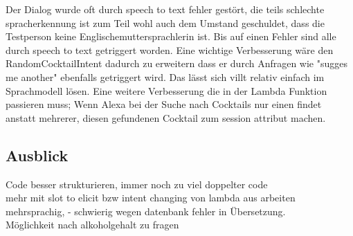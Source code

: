 \documentclass[12pt,letterpaper]{article}
\begin{document}
Der Dialog wurde oft durch speech to text fehler gestört, die teils schlechte spracherkennung ist zum Teil wohl auch dem Umstand geschuldet, dass die Testperson keine Englischemuttersprachlerin ist.
Bis auf einen Fehler sind alle durch speech to text getriggert worden.
Eine wichtige Verbesserung wäre den RandomCocktailIntent dadurch zu erweitern dass er durch Anfragen wie "sugges me another" ebenfalls getriggert wird. Das lässt sich villt relativ einfach im Sprachmodell lösen.
Eine weitere Verbesserung die in der Lambda Funktion passieren muss; Wenn Alexa bei der Suche nach Cocktails nur einen findet anstatt mehrerer, diesen gefundenen Cocktail zum session attribut machen.

\subsection{Ausblick}
Code besser strukturieren, immer noch zu viel doppelter code\\
mehr mit slot to elicit bzw intent changing von lambda aus arbeiten\\
mehrsprachig, - schwierig wegen datenbank fehler in Übersetzung.\\
Möglichkeit nach alkoholgehalt zu fragen
\end{document}
